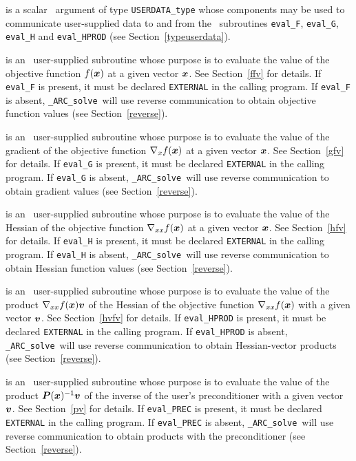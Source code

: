 \documentclass{galahad}
\newcommand{\packagename}{ARC}
\newcommand{\fullpackagename}{\libraryname\_\packagename}
\newcommand{\solver}{{\tt \fullpackagename\_solve}}
\begin{document}
\begin{description}
 is a scalar \intentinout\ argument of type
{\tt USERDATA\_type} whose components may be used
to communicate user-supplied data to and from the
\optional\ subroutines
{\tt eval\_F}, {\tt eval\_G},
{\tt eval\_H} and {\tt eval\_HPROD}
(see Section~\ref{typeuserdata}).

 is an \optional\
user-supplied subroutine whose purpose is to evaluate the value of the
objective function $f({\bm{x}})$ at a given vector ${\bm{x}}$.
See Section~\ref{ffv} for details.
If {\tt eval\_F} is present,
it must be declared {\tt EXTERNAL} in the calling program.
If {\tt eval\_F} is absent, \solver\ will use reverse communication to
obtain objective function values (see Section~\ref{reverse}).

 is an \optional\
user-supplied subroutine whose purpose is to evaluate the value of the
gradient of the objective function $\nabla_x f({\bm{x}})$ at a given vector ${\bm{x}}$.
See Section~\ref{gfv} for details.
If {\tt eval\_G} is present,
it must be declared {\tt EXTERNAL} in the calling program.
If {\tt eval\_G} is absent, \solver\ will use reverse communication to
obtain gradient values (see Section~\ref{reverse}).

 is an \optional\
user-supplied subroutine whose purpose is to evaluate the value of the
Hessian of the objective function $\nabla_{xx} f({\bm{x}})$ at a given vector ${\bm{x}}$.
See Section~\ref{hfv} for details.
If {\tt eval\_H} is present,
it must be declared {\tt EXTERNAL} in the calling program.
If {\tt eval\_H} is absent, \solver\ will use reverse communication to
obtain Hessian function values (see Section~\ref{reverse}).

\itt{eval\_HPROD} is an \optional\
user-supplied subroutine whose purpose is to evaluate the value of the
product $\nabla_{xx} f({\bm{x}}){\bm{v}}$ of the Hessian of the objective function
$\nabla_{xx} f({\bm{x}})$  with a given vector ${\bm{v}}$.
See Section~\ref{hvfv} for details.
If {\tt eval\_HPROD} is present,
it must be declared {\tt EXTERNAL} in the calling program.
If {\tt eval\_HPROD} is absent, \solver\ will use reverse communication to
obtain Hessian-vector products (see Section~\ref{reverse}).

\itt{eval\_PREC} is an \optional\
user-supplied subroutine whose purpose is to evaluate the value of the
product ${\bm{P}}({\bm{x}})^{-1}{\bm{v}}$ of the inverse of the user's preconditioner 
with a given vector ${\bm{v}}$. See Section~\ref{pv} for details.
If {\tt eval\_PREC} is present,
it must be declared {\tt EXTERNAL} in the calling program.
If {\tt eval\_PREC} is absent, \solver\ will use reverse communication to
obtain products with the preconditioner (see Section~\ref{reverse}).

\end{description}
\end{document}
